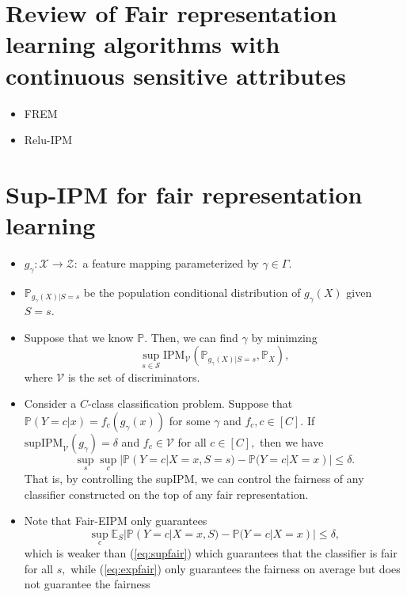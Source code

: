 \documentclass{article}
\begin{document}
\section{Review of Fair representation learning algorithms with continuous sensitive attributes}

\begin{itemize}

    \item FREM
    \item Relu-IPM
\end{itemize}


\section{Sup-IPM for fair representation learning}

\begin{itemize}
    \item $g_\gamma: \mathcal{X} \rightarrow \mathcal{Z}:$ a feature mapping parameterized by $\gamma\in \Gamma.$
    \item $\mathbb{P}_{g_\gamma(X)|S=s}$ be the population conditional distribution of $g_\gamma(X)$ given $S=s.$
    \item Suppose that we know $\mathbb{P}.$ Then, we can find $\gamma$ by minimzing
    $$\sup_{s\in \mathcal{S}}\text{IPM}_{\mathcal{V}}(\mathbb{P}_{g_\gamma(X)|S=s}, \mathbb{P}_X),$$
    where $\mathcal{V}$ is the set of discriminators.
    \item Consider a $C$-class classification problem. Suppose that
    $\mathbb{P}(Y=c|x)=f_c(g_\gamma(x))$ for some $\gamma$ and $f_c, c\in [C].$
    If $\text{supIPM}_{\mathcal{V}} (g_\gamma)=\delta$ and $f_c\in \mathcal{V}$ for all $c\in [C],$ then
    we have
    \begin{equation}
    \label{eq:supfair}
    \sup_s \sup_{c} |\mathbb{P}(Y=c|X=x,S=s) - \mathbb{P}(Y=c|X=x)| \le \delta.
    \end{equation}
    That is, by controlling the supIPM, we can control the fairness of any classifier constructed
    on the top of any fair representation.
    \item Note that Fair-EIPM only guarantees 
    \begin{equation}
    \label{eq:expfair}
    \sup_c \mathbb{E}_S |\mathbb{P}(Y=c|X=x,S) - \mathbb{P}(Y=c|X=x)| \le \delta,
    \end{equation}
    which is weaker than (\ref{eq:supfair}) which guarantees that the classifier is fair for all $s,$
    while (\ref{eq:expfair}) only guarantees the fairness on average but does not guarantee the fairness

\end{itemize}
\end{document}
